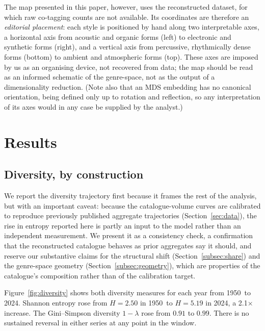 \documentclass[12pt, a4paper]{article}
\newcommand{\gsYearMin}{1950}%
\newcommand{\gsYearMax}{2024}%
\newcommand{\gsShannonFirst}{2.50}%
\newcommand{\gsShannonLast}{5.19}%
\newcommand{\gsShannonGrowth}{2.1}%
\newcommand{\gsSimpsonFirst}{0.91}%
\newcommand{\gsSimpsonLast}{0.99}%
\begin{document}
The map presented in this paper, however, uses the reconstructed dataset,
for which raw co-tagging counts are not available. Its coordinates are
therefore an \emph{editorial placement}: each style is positioned by hand
along two interpretable axes, a horizontal axis from acoustic and organic
forms (left) to electronic and synthetic forms (right), and a vertical axis
from percussive, rhythmically dense forms (bottom) to ambient and
atmospheric forms (top). These axes are imposed by us as an organising
device, not recovered from data; the map should be read as an informed
schematic of the genre-space, not as the output of a dimensionality
reduction. (Note also that an MDS embedding has no canonical orientation,
being defined only up to rotation and reflection, so any interpretation of
its axes would in any case be supplied by the analyst.)

\section{Results}
\label{sec:results}

\subsection{Diversity, by construction}

We report the diversity trajectory first because it frames the rest of the
analysis, but with an important caveat: because the catalogue-volume curves
are calibrated to reproduce previously published aggregate trajectories
(Section~\ref{sec:data}), the rise in entropy reported here is partly an
input to the model rather than an independent measurement. We present it as
a consistency check, a confirmation that the reconstructed catalogue behaves
as prior aggregates say it should, and reserve our substantive claims for the
structural shift (Section~\ref{subsec:share}) and the genre-space geometry
(Section~\ref{subsec:geometry}), which are properties of the catalogue's
composition rather than of the calibration target.

Figure~\ref{fig:diversity} shows both diversity measures for each year from
\gsYearMin\ to \gsYearMax. Shannon entropy rose from
$H = \gsShannonFirst$ in \gsYearMin\ to
$H = \gsShannonLast$ in \gsYearMax, a
\gsShannonGrowth$\times$ increase. The Gini--Simpson diversity
$1 - \lambda$ rose from $\gsSimpsonFirst$ to $\gsSimpsonLast$.
There is no sustained reversal in either series at any point in the window.
\end{document}
